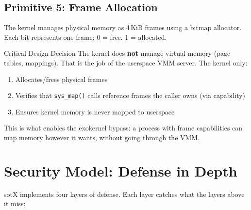 \documentclass[11pt,a4paper]{article}
\begin{document}
\subsection{Primitive 5: Frame Allocation}

The kernel manages physical memory as 4\,KiB frames using a bitmap allocator.
Each bit represents one frame: 0 = free, 1 = allocated.

\begin{warningbox}{Critical Design Decision}
The kernel does \textbf{not} manage virtual memory (page tables, mappings).
That is the job of the userspace VMM server. The kernel only:
\begin{enumerate}[leftmargin=1.5em]
  \item Allocates/frees physical frames
  \item Verifies that \texttt{sys\_map()} calls reference frames the caller owns (via capability)
  \item Ensures kernel memory is never mapped to userspace
\end{enumerate}
This is what enables the exokernel bypass: a process with frame capabilities
can map memory however it wants, without going through the VMM.
\end{warningbox}

\section{Security Model: Defense in Depth}

sotX implements four layers of defense. Each layer catches what the layers
above it miss:
\end{document}
